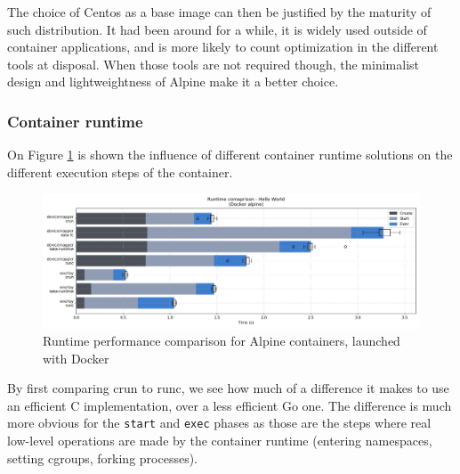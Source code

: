 The choice of Centos as a base image can then be justified by the maturity of such distribution.  It had been around for a while, it is widely used outside of container applications, and is more likely to count optimization in the different tools at disposal.  When those tools are not required though, the minimalist design and lightweightness of Alpine make it a better choice.

\subsubsection{Container runtime}

On Figure \ref{fig:q1:runtime} is shown the influence of different container runtime solutions on the different execution steps of the container.  

\begin{figure}[h!]
  \begin{center}
    \includegraphics[width=\linewidth]{images/question-1-runtime.png}
    \caption{Runtime performance comparison for Alpine containers, launched with Docker}
    \label{fig:q1:runtime}
  \end{center}
\end{figure}

By first comparing crun to runc, we see how much of a difference it makes to use an efficient C implementation, over a less efficient Go one.  The difference is much more obvious for the \texttt{start} and \texttt{exec} phases as those are the steps where real low-level operations are made by the container runtime (entering namespaces, setting cgroups, forking processes).  

